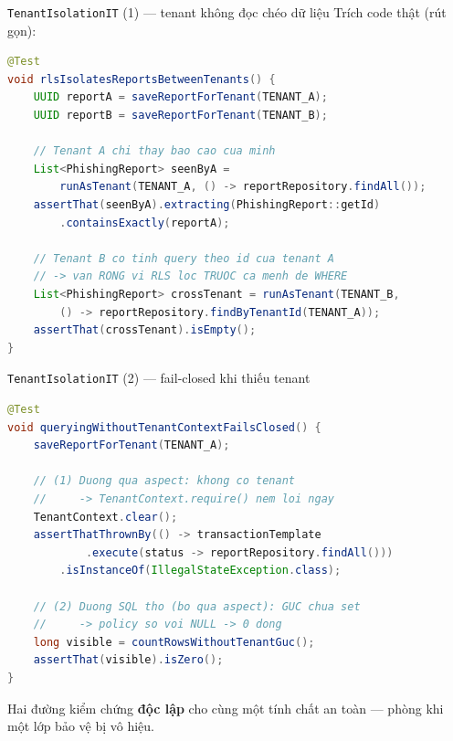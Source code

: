 \documentclass[aspectratio=169,12pt]{beamer}
\begin{document}
\begin{frame}[fragile]{\texttt{TenantIsolationIT} (1) --- tenant không đọc chéo dữ liệu}
  \small Trích code thật (rút gọn):
\begin{lstlisting}[language=java,basicstyle=\ttfamily\scriptsize]
@Test
void rlsIsolatesReportsBetweenTenants() {
    UUID reportA = saveReportForTenant(TENANT_A);
    UUID reportB = saveReportForTenant(TENANT_B);

    // Tenant A chi thay bao cao cua minh
    List<PhishingReport> seenByA =
        runAsTenant(TENANT_A, () -> reportRepository.findAll());
    assertThat(seenByA).extracting(PhishingReport::getId)
        .containsExactly(reportA);

    // Tenant B co tinh query theo id cua tenant A
    // -> van RONG vi RLS loc TRUOC ca menh de WHERE
    List<PhishingReport> crossTenant = runAsTenant(TENANT_B,
        () -> reportRepository.findByTenantId(TENANT_A));
    assertThat(crossTenant).isEmpty();
}
\end{lstlisting}
\end{frame}

\begin{frame}[fragile]{\texttt{TenantIsolationIT} (2) --- fail-closed khi thiếu tenant}
\begin{lstlisting}[language=java,basicstyle=\ttfamily\scriptsize]
@Test
void queryingWithoutTenantContextFailsClosed() {
    saveReportForTenant(TENANT_A);

    // (1) Duong qua aspect: khong co tenant
    //     -> TenantContext.require() nem loi ngay
    TenantContext.clear();
    assertThatThrownBy(() -> transactionTemplate
            .execute(status -> reportRepository.findAll()))
        .isInstanceOf(IllegalStateException.class);

    // (2) Duong SQL tho (bo qua aspect): GUC chua set
    //     -> policy so voi NULL -> 0 dong
    long visible = countRowsWithoutTenantGuc();
    assertThat(visible).isZero();
}
\end{lstlisting}
  \small Hai đường kiểm chứng \textbf{độc lập} cho cùng một tính chất an toàn --- phòng khi một lớp bảo vệ bị vô hiệu.
\end{frame}
\end{document}
